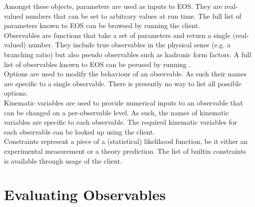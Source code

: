 Amongst these objects, parameters are used as inputs to EOS. They are
real-valued numbers that can be set to arbitrary values at run time.  The full
list of parameters known to EOS can be browsed by running the
 client.\\

Observables are functions that take a set of parameters and return a single
(real-valued) number. They include true observables in the physical sense (e.g.
a branching ratio) but also pseudo observables such as hadronic form factors.
A full list of observables known to EOS can be perused by running
.\\

Options are used to modify the behaviour of an observable. As such their
names are specific to a single observable. There is presently no way to list
all possible options.\\

Kinematic variables are used to provide numerical inputs to an observable that can
be changed on a per-observable level. As such, the names of kinematic variables are
specific to each observable. The required kinematic variables for each observable
can be looked up using the  client.\\

Constraints represent a piece of a (statistical) likelihood function, be it either
an experimental measurement or a theory prediction. The list of builtin constraints
is available through usage of the  client.


\section{Evaluating Observables}
\label{sec:usage:eos-evaluate}

